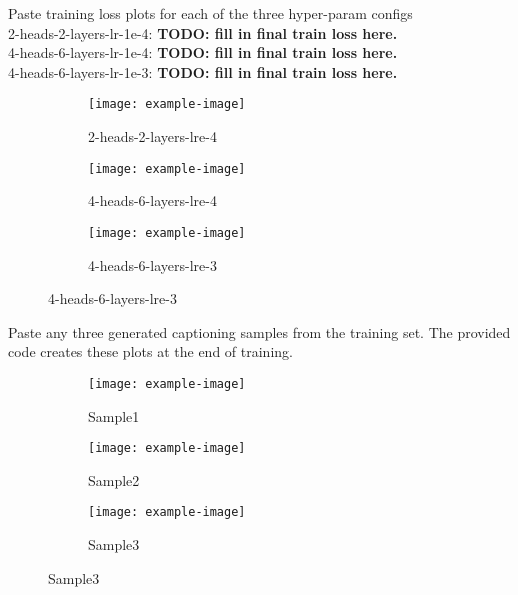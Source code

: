 \documentclass[11pt,addpoints,answers]{exam}
\numberwithin{equation}{section} %
\numberwithin{figure}{section} %
\numberwithin{table}{section} %
\begin{document}
\begin{questions}
\question Paste training loss plots for each of the three hyper-param configs
\\
2-heads-2-layers-lr-1e-4: \textbf{TODO: fill in final train loss here.} \\
4-heads-6-layers-lr-1e-4: \textbf{TODO: fill in final train loss here.} \\
4-heads-6-layers-lr-1e-3: \textbf{TODO: fill in final train loss here.} 
\begin{figure}[H]
    \centering
    \begin{subfigure}[b]{0.32\linewidth}
        \texttt{[image: example-image]}
        \caption{2-heads-2-layers-lre-4}
    \end{subfigure}
    \begin{subfigure}[b]{0.32\linewidth}
        \texttt{[image: example-image]}
        \caption{4-heads-6-layers-lre-4}
    \end{subfigure}
    \begin{subfigure}[b]{0.32\linewidth}
        \texttt{[image: example-image]}
        \caption{4-heads-6-layers-lre-3}
    \end{subfigure}
    
\end{figure}
\question Paste any three generated captioning samples from the training set. The provided code creates these plots at the end of training.
\\
\begin{figure}[H]
    \centering
    \begin{subfigure}[b]{0.32\linewidth}
        \texttt{[image: example-image]}
        \caption{Sample1}
    \end{subfigure}
    \begin{subfigure}[b]{0.32\linewidth}
        \texttt{[image: example-image]}
        \caption{Sample2}
    \end{subfigure}
    \begin{subfigure}[b]{0.32\linewidth}
        \texttt{[image: example-image]}
        \caption{Sample3}
    \end{subfigure}
\end{figure}

\end{questions}
\clearpage
\end{document}
